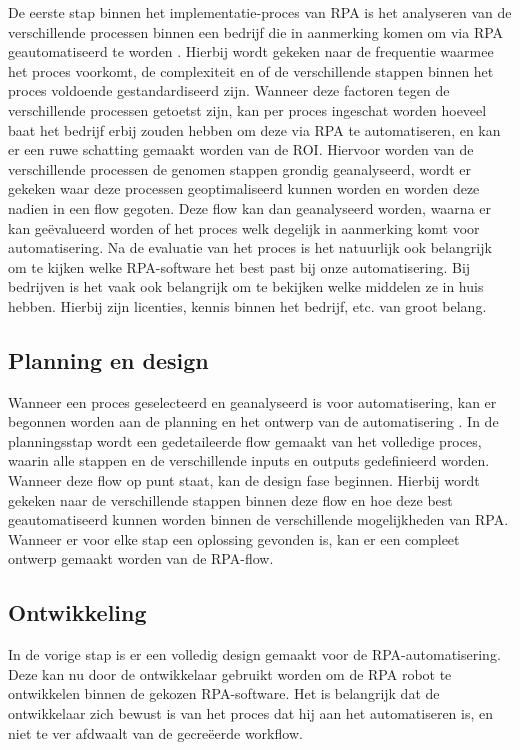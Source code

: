 De eerste stap binnen het implementatie-proces van RPA is het analyseren van de verschillende processen binnen een bedrijf die in aanmerking komen om via RPA geautomatiseerd te worden \autocite{vanDerAalst2018}. Hierbij wordt gekeken naar de frequentie waarmee het proces voorkomt, de complexiteit en of de verschillende stappen binnen het proces voldoende gestandardiseerd zijn. Wanneer deze factoren tegen de verschillende processen getoetst zijn, kan per proces ingeschat worden hoeveel baat het bedrijf erbij zouden hebben om deze via RPA te automatiseren, en kan er een ruwe schatting gemaakt worden van de ROI. 
Hiervoor worden van de verschillende processen de genomen stappen grondig geanalyseerd, wordt er gekeken waar deze processen geoptimaliseerd kunnen worden en worden deze nadien in een flow gegoten. Deze flow kan dan geanalyseerd worden, waarna er kan geëvalueerd worden of het proces welk degelijk in aanmerking komt voor automatisering.
Na de evaluatie van het proces is het natuurlijk ook belangrijk om te kijken welke RPA-software het best past bij onze automatisering. Bij bedrijven is het vaak ook belangrijk om te bekijken welke middelen ze in huis hebben. Hierbij zijn licenties, kennis binnen het bedrijf, etc. van groot belang.

\subsection{Planning en design}
\label{subsec:planning-en-design}

Wanneer een proces geselecteerd en geanalyseerd is voor automatisering, kan er begonnen worden aan de planning en het ontwerp van de automatisering \autocite{Fernandez2021}. In de planningsstap wordt een gedetaileerde flow gemaakt van het volledige proces, waarin alle stappen en de verschillende inputs en outputs gedefinieerd worden. Wanneer deze flow op punt staat, kan de design fase beginnen. Hierbij wordt gekeken naar de verschillende stappen binnen deze flow en hoe deze best geautomatiseerd kunnen worden binnen de verschillende mogelijkheden van RPA. Wanneer er voor elke stap een oplossing gevonden is, kan er een compleet ontwerp gemaakt worden van de RPA-flow.

\subsection{Ontwikkeling}
\label{subsec:ontwikkeling}

In de vorige stap is er een volledig design gemaakt voor de RPA-automatisering. Deze kan nu door de ontwikkelaar gebruikt worden om de RPA robot te ontwikkelen binnen de gekozen RPA-software. Het is belangrijk dat de ontwikkelaar zich bewust is van het proces dat hij aan het automatiseren is, en niet te ver afdwaalt van de gecreëerde workflow.


